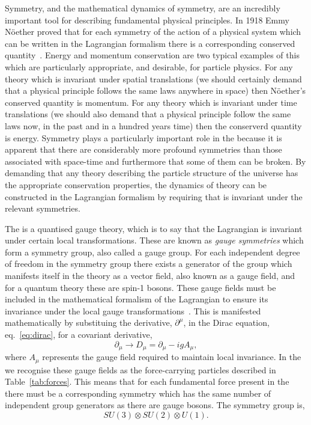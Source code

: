 Symmetry, and the mathematical dynamics of symmetry, are an incredibly important tool for describing fundamental physical principles. In 1918 Emmy N\"{o}ether proved that for each symmetry of the action of a physical system which can be written in the Lagrangian formalism there is a corresponding conserved quantity~\cite{noether,noether_trans}. Energy and momentum conservation are two typical examples of this which are particularly appropriate, and desirable, for particle physics. For any theory which is invariant under spatial translations (we should certainly demand that a physical principle follows the same laws anywhere in space) then N\"{o}ether's conserved quantity is momentum. For any theory which is invariant under time translations (we should also demand that a physical principle follow the same laws now, in the past and in a hundred years time) then the conserverd quantity is energy. Symmetry plays a particularly important role in the \SM because it is apparent that there are considerably more profound symmetries than those associated with space-time and furthermore that some of them can be broken. By demanding that any theory describing the particle structure of the universe has the appropriate conservation properties, the dynamics of theory can be constructed in the Lagrangian formalism by requiring that is invariant under the relevant symmetries. 

The \SM is a quantised gauge theory, which is to say that the \SM Lagrangian is invariant under certain local transformations. These are known as \textit{gauge symmetries} which form a symmetry group, also called a gauge group. For each independent degree of freedom in the symmetry group there exists a generator of the group which manifests itself in the theory as a vector field, also known as a gauge field, and for a quantum theory these are spin-1 bosons. These gauge fields must be included in the mathematical formalism of the Lagrangian to ensure its invariance under the local gauge transformations~\cite{Guidry}. This is manifested mathematically by substituing the derivative, $\partial^{\mu}$, in the Dirac equation, eq.~\ref{eq:dirac}, for a covariant derivative,
\begin{equation}
  \partial_{\mu} \rightarrow D_{\mu} = \partial_{\mu}-igA_{\mu},
\end{equation}
where $A_{\mu}$ represents the gauge field required to maintain local invariance. In the \SM we recognise these gauge fields as the force-carrying particles described in Table~\ref{tab:forces}. This means that for each fundamental force present in the \SM there must be a corresponding symmetry which has the same number of independent group generators as there are gauge bosons. The \SM symmetry group is,
\begin{equation}
  SU(3) \otimes SU(2) \otimes U(1).
\end{equation}


